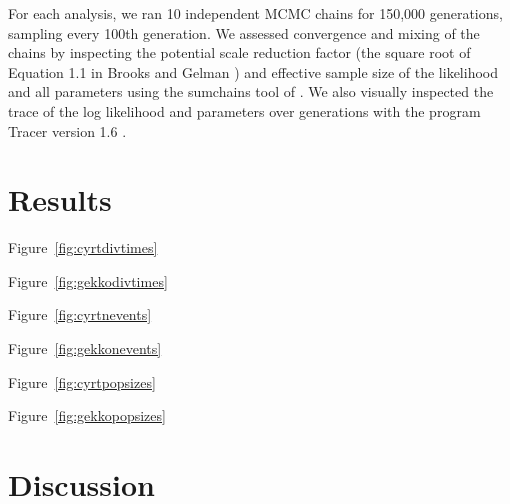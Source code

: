 For each analysis, we ran 10 independent MCMC chains for 150,000 generations,
sampling every 100th generation.
We assessed convergence and mixing of the chains by inspecting the potential scale
reduction factor (the square root of Equation 1.1 in Brooks and Gelman
\citeyear{Brooks1998}) and effective sample size \citep{Gong2014} of the
likelihood and all parameters using the sumchains tool of \pycoevolity.
We also visually inspected the trace of the log likelihood and parameters over
generations with the program Tracer version 1.6 \citep{Tracer16}.


\section{Results}

Figure~\ref{fig:cyrtdivtimes}

Figure~\ref{fig:gekkodivtimes}

Figure~\ref{fig:cyrtnevents}

Figure~\ref{fig:gekkonevents}

Figure~\ref{fig:cyrtpopsizes}

Figure~\ref{fig:gekkopopsizes}

\section{Discussion}

